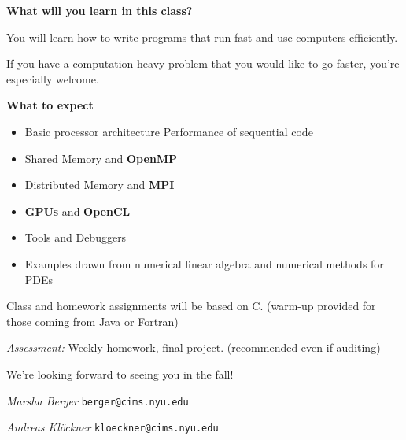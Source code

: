 \Large

{\sffamily\Large\bfseries What will you learn in this class?}

You will learn how to write programs that run fast and use computers
efficiently.

If you have a computation-heavy problem that you would like to go
faster, you're especially welcome.

\begin{comment}
\textbf{Pop Quiz:} \$400 at your favorite electronics retailer
buys you a parallel computer that will do
$4\cdot 10^{12}$ floating point operations (``flops'') per second,
but only load $5\cdot 10^{10}$ values from memory in the same
amount of time. How do you use such a machine well?
\end{comment}

\vspace{2.5ex}
{\sffamily\Large\bfseries What to expect}
\vspace{-1.5ex}
\begin{itemize}
\setlength{\itemsep}{-1mm}
  \item Basic processor architecture
    Performance of sequential code
  \item Shared Memory and \textbf{OpenMP}
  \item Distributed Memory and \textbf{MPI}
  \item \textbf{GPUs} and \textbf{OpenCL}
  \item Tools and Debuggers
  \item Examples drawn from numerical linear algebra and numerical
    methods for PDEs
\end{itemize}

Class and homework assignments will be based on C.
(warm-up provided for those coming from
Java or Fortran)

\emph{Assessment:} Weekly homework, final
project. (recommended even if auditing)

We're looking forward to seeing you in the fall!
\vspace{1.5ex}

\hfill
\begin{minipage}{0.4\columnwidth}
  \raggedright
  \emph{Marsha Berger}
  \small\texttt{berger@cims.nyu.edu}
\end{minipage}
\hfill
\begin{minipage}{0.5\columnwidth}
  \raggedright
  \emph{Andreas Klöckner}
  \small \texttt{kloeckner@cims.nyu.edu}
\end{minipage}

